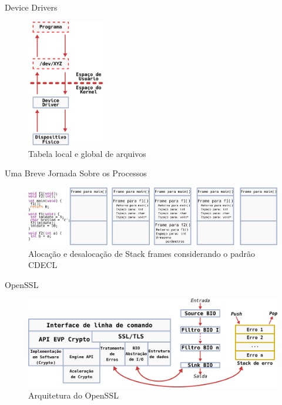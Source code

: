 \documentclass[xcolor={usenames,svgnames,dvipsnames},brazil,english,12pt,aspectratio=149]{beamer}
\begin{document}
\begin{frame}{Device Drivers}
  \begin{figure}[!h]
    \centering
    \includegraphics[width=0.3\textwidth]{dd} 
    \caption*{Tabela local e global de arquivos}
  \end{figure}
\end{frame}

\begin{frame}{Uma Breve Jornada Sobre os Processos}
  \begin{figure}[!h]
    \centering
    \includegraphics[width=\textwidth]{stack_frame}
    \caption*{Alocação e desalocação de Stack frames considerando o padrão CDECL}
  \end{figure}
\end{frame}

\begin{frame}{OpenSSL}
  \begin{figure}[!h]
    \centering
    \includegraphics[width=\textwidth]{openssl_arch}
    \caption*{Arquitetura do OpenSSL}
  \end{figure}
\end{frame}
\end{document}
